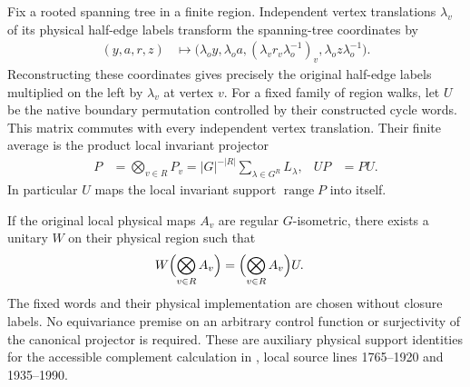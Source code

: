 \begin{lemma}%
    \label{thm:peps_cycle_controlled_local_support}
    \leanok
    Fix a rooted spanning tree in a finite region. Independent vertex
    translations $\lambda_v$ of its physical half-edge labels
    transform the spanning-tree coordinates by
    \begin{align}
        (y,a,r,z) & \longmapsto
        \bigl(\lambda_oy,\lambda_oa,
        (\lambda_vr_v\lambda_o^{-1})_v,
        \lambda_oz\lambda_o^{-1}\bigr).
        \label{eq:peps_local_translation_coordinates}
    \end{align}
    Reconstructing these coordinates gives precisely the original
    half-edge labels multiplied on the left by $\lambda_v$ at vertex $v$.
    For a fixed family of region walks, let $U$ be the native
    boundary permutation controlled by their constructed cycle words.
    This matrix commutes with every independent vertex translation.
    Their finite average is the product local invariant projector
    \begin{align}
        P & =\bigotimes_{v\in R}P_v
        =|G|^{-|R|}\sum_{\lambda\in G^R}L_\lambda,
          & UP                      & =PU.
        \label{eq:peps_controlled_local_projector}
    \end{align}
    In particular $U$ maps the local invariant support
    $\operatorname{range}P$ into itself.

    If the original local physical maps $A_v$ are regular $G$-isometric,
    there exists a unitary $W$ on their physical region such that
    \begin{align}
        W\Bigl(\bigotimes_{v\in R}A_v\Bigr)
         & =\Bigl(\bigotimes_{v\in R}A_v\Bigr)U.
    \end{align}
    The fixed words and their physical implementation are chosen without
    closure labels. No equivariance premise on an arbitrary control
    function or surjectivity of the canonical projector is required.
    These are auxiliary physical support identities for the accessible
    complement calculation in \cite[\S6.2--6.3]{Schuch2010PEPS},
    local source lines 1765--1920 and 1935--1990.
\end{lemma}

